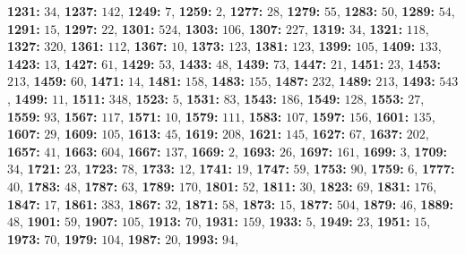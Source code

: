 \textsf{\bfseries 1231:} $34$, \textsf{\bfseries 1237:} $142$, \textsf{\bfseries 1249:} $7$, \textsf{\bfseries 1259:} $2$, \textsf{\bfseries 1277:} $28$, \textsf{\bfseries 1279:} $55$, \textsf{\bfseries 1283:} $50$, \textsf{\bfseries 1289:} $54$, \textsf{\bfseries 1291:} $15$, \textsf{\bfseries 1297:} $22$, \textsf{\bfseries 1301:} $524$, \textsf{\bfseries 1303:} $106$, \textsf{\bfseries 1307:} $227$, \textsf{\bfseries 1319:} $34$, \textsf{\bfseries 1321:} $118$, \textsf{\bfseries 1327:} $320$, \textsf{\bfseries 1361:} $112$, \textsf{\bfseries 1367:} $10$, \textsf{\bfseries 1373:} $123$, \textsf{\bfseries 1381:} $123$, \textsf{\bfseries 1399:} $105$, \textsf{\bfseries 1409:} $133$, \textsf{\bfseries 1423:} $13$, \textsf{\bfseries 1427:} $61$, \textsf{\bfseries 1429:} $53$, \textsf{\bfseries 1433:} $48$, \textsf{\bfseries 1439:} $73$, \textsf{\bfseries 1447:} $21$, \textsf{\bfseries 1451:} $23$, \textsf{\bfseries 1453:} $213$, \textsf{\bfseries 1459:} $60$, \textsf{\bfseries 1471:} $14$, \textsf{\bfseries 1481:} $158$, \textsf{\bfseries 1483:} $155$, \textsf{\bfseries 1487:} $232$, \textsf{\bfseries 1489:} $213$, \textsf{\bfseries 1493:} $543$, \textsf{\bfseries 1499:} $11$, \textsf{\bfseries 1511:} $348$, \textsf{\bfseries 1523:} $5$, \textsf{\bfseries 1531:} $83$, \textsf{\bfseries 1543:} $186$, \textsf{\bfseries 1549:} $128$, \textsf{\bfseries 1553:} $27$, \textsf{\bfseries 1559:} $93$, \textsf{\bfseries 1567:} $117$, \textsf{\bfseries 1571:} $10$, \textsf{\bfseries 1579:} $111$, \textsf{\bfseries 1583:} $107$, \textsf{\bfseries 1597:} $156$, \textsf{\bfseries 1601:} $135$, \textsf{\bfseries 1607:} $29$, \textsf{\bfseries 1609:} $105$, \textsf{\bfseries 1613:} $45$, \textsf{\bfseries 1619:} $208$, \textsf{\bfseries 1621:} $145$, \textsf{\bfseries 1627:} $67$, \textsf{\bfseries 1637:} $202$, \textsf{\bfseries 1657:} $41$, \textsf{\bfseries 1663:} $604$, \textsf{\bfseries 1667:} $137$, \textsf{\bfseries 1669:} $2$, \textsf{\bfseries 1693:} $26$, \textsf{\bfseries 1697:} $161$, \textsf{\bfseries 1699:} $3$, \textsf{\bfseries 1709:} $34$, \textsf{\bfseries 1721:} $23$, \textsf{\bfseries 1723:} $78$, \textsf{\bfseries 1733:} $12$, \textsf{\bfseries 1741:} $19$, \textsf{\bfseries 1747:} $59$, \textsf{\bfseries 1753:} $90$, \textsf{\bfseries 1759:} $6$, \textsf{\bfseries 1777:} $40$, \textsf{\bfseries 1783:} $48$, \textsf{\bfseries 1787:} $63$, \textsf{\bfseries 1789:} $170$, \textsf{\bfseries 1801:} $52$, \textsf{\bfseries 1811:} $30$, \textsf{\bfseries 1823:} $69$, \textsf{\bfseries 1831:} $176$, \textsf{\bfseries 1847:} $17$, \textsf{\bfseries 1861:} $383$, \textsf{\bfseries 1867:} $32$, \textsf{\bfseries 1871:} $58$, \textsf{\bfseries 1873:} $15$, \textsf{\bfseries 1877:} $504$, \textsf{\bfseries 1879:} $46$, \textsf{\bfseries 1889:} $48$, \textsf{\bfseries 1901:} $59$, \textsf{\bfseries 1907:} $105$, \textsf{\bfseries 1913:} $70$, \textsf{\bfseries 1931:} $159$, \textsf{\bfseries 1933:} $5$, \textsf{\bfseries 1949:} $23$, \textsf{\bfseries 1951:} $15$, \textsf{\bfseries 1973:} $70$, \textsf{\bfseries 1979:} $104$, \textsf{\bfseries 1987:} $20$, \textsf{\bfseries 1993:} $94$, 
